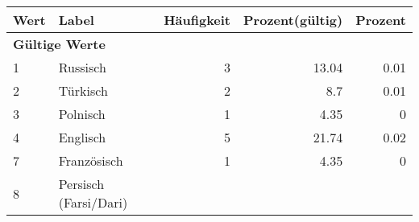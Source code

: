      \begin{longtable}{lXrrr}
     \toprule
     \textbf{Wert} & \textbf{Label} & \textbf{Häufigkeit} & \textbf{Prozent(gültig)} & \textbf{Prozent} \\
     \endhead
     \midrule
     \multicolumn{5}{l}{\textbf{Gültige Werte}}\\

     1 &
     \multicolumn{1}{X}{ Russisch   } &


       \num{3} &
       \num[round-mode=places,round-precision=2]{13,04} &
         \num[round-mode=places,round-precision=2]{0,01} \\

     2 &
     \multicolumn{1}{X}{ Türkisch   } &


       \num{2} &
       \num[round-mode=places,round-precision=2]{8,7} &
         \num[round-mode=places,round-precision=2]{0,01} \\

     3 &
     \multicolumn{1}{X}{ Polnisch   } &


       \num{1} &
       \num[round-mode=places,round-precision=2]{4,35} &
         \num[round-mode=places,round-precision=2]{0} \\

     4 &
     \multicolumn{1}{X}{ Englisch   } &


       \num{5} &
       \num[round-mode=places,round-precision=2]{21,74} &
         \num[round-mode=places,round-precision=2]{0,02} \\

     7 &
     \multicolumn{1}{X}{ Französisch   } &


       \num{1} &
       \num[round-mode=places,round-precision=2]{4,35} &
         \num[round-mode=places,round-precision=2]{0} \\

     8 &
     \multicolumn{1}{X}{ Persisch (Farsi/Dari)   } &



\end{longtable}
